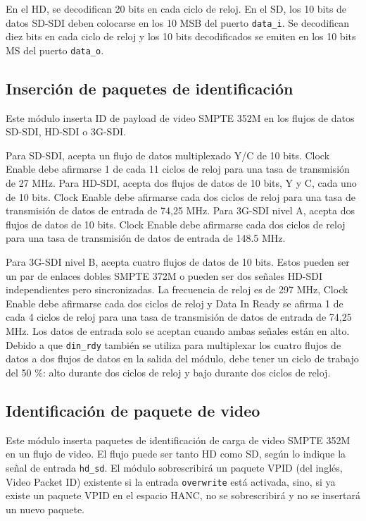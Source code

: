 En el HD, se decodifican 20 bits en cada ciclo de reloj. En el SD, los 10 bits
de datos SD-SDI deben colocarse en los 10 MSB del puerto \texttt{data\_i}. Se
decodifican diez bits en cada ciclo de reloj y los 10 bits decodificados se
emiten en los 10 bits MS del puerto \texttt{data\_o}.

\subsection{Inserción de paquetes de identificación}

Este módulo inserta ID de payload de video SMPTE 352M en los flujos de datos
SD-SDI, HD-SDI o 3G-SDI\@.

Para SD-SDI, acepta un flujo de datos multiplexado Y/C de 10 bits. Clock Enable
debe afirmarse 1 de cada 11 ciclos de reloj para una tasa de transmisión de 27
MHz. Para HD-SDI, acepta dos flujos de datos de 10 bits, Y y C, cada uno de
10 bits. Clock Enable debe afirmarse cada dos ciclos de reloj para una tasa de
transmisión de datos de entrada de 74,25 MHz. Para 3G-SDI nivel A, acepta dos
flujos de datos de 10 bits. Clock Enable debe afirmarse cada dos ciclos de
reloj para una tasa de transmisión de datos de entrada de 148.5 MHz.

Para 3G-SDI nivel B, acepta cuatro flujos de datos de 10 bits. Estos pueden ser
un par de enlaces dobles SMPTE 372M o pueden ser dos señales HD-SDI
independientes pero sincronizadas. La frecuencia de reloj es de 297 MHz,
Clock Enable debe afirmarse cada dos ciclos de reloj y Data In Ready se
afirma 1 de cada 4 ciclos de reloj para una tasa de transmisión de datos de
entrada de 74,25 MHz. Los datos de entrada solo se aceptan cuando ambas
señales están en alto. Debido a que \texttt{din\_rdy} también se utiliza para
multiplexar los cuatro flujos de datos a dos flujos de datos en la salida del
módulo, debe tener un ciclo de trabajo del 50 \%: alto durante dos ciclos de
reloj y bajo durante dos ciclos de reloj.

\subsection{Identificación de paquete de video}

Este módulo inserta paquetes de identificación de carga de video SMPTE 352M~\citep{st352} en
un flujo de video. El flujo puede ser tanto HD como SD, según lo indique la
señal de entrada \texttt{hd\_sd}. El módulo sobrescribirá un paquete VPID  (del inglés, Video Packet ID) existente si la
entrada \texttt{overwrite} está activada, sino, si ya existe un paquete VPID en
el espacio HANC, no se sobrescribirá y no se insertará un nuevo paquete.

